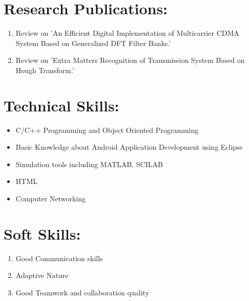 \documentclass[a4 paper,12pt]{article}
\begin{document}
\begin{minipage}{0.98\textwidth}
	\section{Research Publications:}
	\begin{enumerate}
		\vspace{-0.1in}
		\item Review on 'An Efficient Digital Implementation of
		Multicarrier CDMA System Based on Generalized DFT Filter Banks.'
		\item Review on 'Extra Matters Recognition of Transmission System Based on Hough Transform.'
	\end{enumerate}
\end{minipage}

\begin{minipage}{0.98\textwidth}
	\section{Technical Skills:}
	\begin{itemize}
		\vspace{-0.1in}
		\item C/C++ Programming and Object Oriented Programming
		\item Basic Knowledge about Android Application Development using Eclipse
		\item Simulation tools including MATLAB, SCILAB
		\item HTML
		\item Computer Networking
	\end{itemize}

\section{Soft Skills:}
\begin{enumerate}
	\vspace{-0.1in}
	\item Good Communication skills
	\item Adaptive Nature
	\item Good Teamwork and collaboration quality
\end{enumerate}
\end{minipage}
\end{document}
